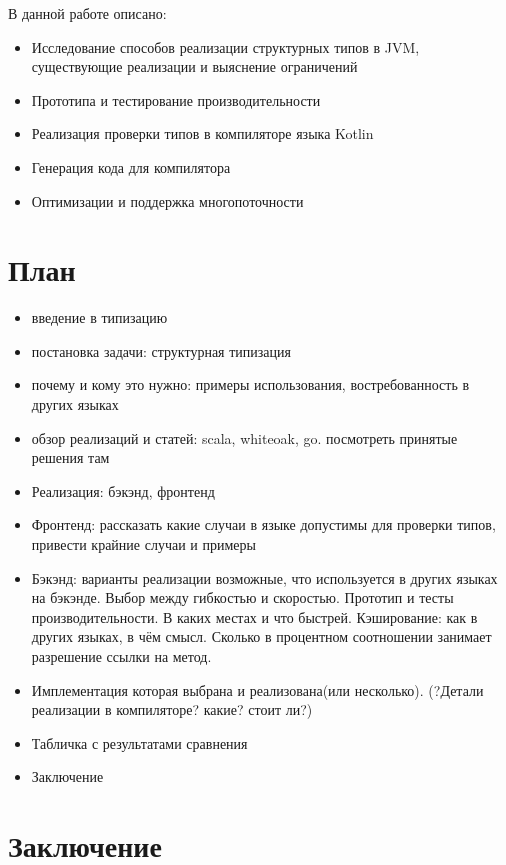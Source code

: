 \documentclass{spbau-diploma}
\begin{document}
В данной работе описано:
\begin{itemize}
    \item Исследование способов реализации структурных типов в JVM, существующие реализации и выяснение ограничений
    \item Прототипа и тестирование производительности
    \item Реализация проверки типов в компиляторе языка Kotlin
    \item Генерация кода для компилятора
    \item Оптимизации и поддержка многопоточности
\end{itemize}
\section{План}

\begin{itemize}
    \item введение в типизацию
    \item постановка задачи: структурная типизация
    \item почему и кому это нужно: примеры использования, востребованность в других языках
    \item обзор реализаций и статей: scala, whiteoak, go. посмотреть принятые решения там
    \item Реализация: бэкэнд, фронтенд
    \item Фронтенд: рассказать какие случаи в языке допустимы для проверки типов, привести крайние случаи и примеры
    \item Бэкэнд: варианты реализации возможные, что используется в других языках на бэкэнде. Выбор между гибкостью и скоростью. Прототип и тесты производительности. В каких местах и что быстрей. Кэширование: как в других языках, в чём смысл. Сколько в процентном соотношении занимает разрешение ссылки на метод.
    \item Имплементация которая выбрана и реализована(или несколько). (?Детали реализации в компиляторе? какие? стоит ли?)
    \item Табличка с результатами сравнения
    \item Заключение
\end{itemize}

\section*{Заключение}



\end{document}
